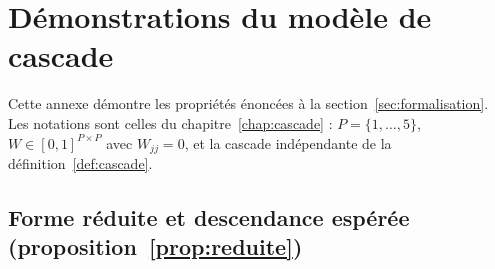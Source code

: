 %

\chapter{Démonstrations du modèle de cascade}
\label{ann:cascade}


Cette annexe démontre les propriétés énoncées à la section~\ref{sec:formalisation}. Les
notations sont celles du chapitre~\ref{chap:cascade} : $P=\{1,\dots,5\}$, $W\in[0,1]^{P\times P}$
avec $W_{jj}=0$, et la cascade indépendante de la définition~\ref{def:cascade}.

\section*{Forme réduite et descendance espérée (proposition~\ref{prop:reduite})}

